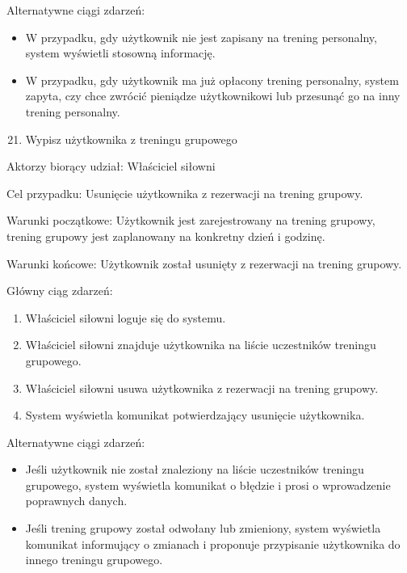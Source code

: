 {Alternatywne ciągi zdarzeń:}

\begin{itemize}
\tightlist
\item
  {W przypadku, gdy użytkownik nie jest zapisany na trening personalny,
  system wyświetli stosowną informację.}
\item
  {W przypadku, gdy użytkownik ma już opłacony trening personalny,
  system zapyta, czy chce zwrócić pieniądze użytkownikowi lub przesunąć
  go na inny trening personalny.}
\end{itemize}

{}

{}

\begin{enumerate}
\setcounter{enumi}{20}
\tightlist
\item
  {Wypisz użytkownika z treningu grupowego}
\end{enumerate}

{Aktorzy biorący udział: Właściciel siłowni}

{Cel przypadku: Usunięcie użytkownika z rezerwacji na trening grupowy.}

{Warunki początkowe: Użytkownik jest zarejestrowany na trening grupowy,
trening grupowy jest zaplanowany na konkretny dzień i godzinę.}

{Warunki końcowe: Użytkownik został usunięty z rezerwacji na trening
grupowy.}

{Główny ciąg zdarzeń:}

\begin{enumerate}
\tightlist
\item
  {Właściciel siłowni loguje się do systemu.}
\item
  {Właściciel siłowni znajduje użytkownika na liście uczestników
  treningu grupowego.}
\item
  {Właściciel siłowni usuwa użytkownika z rezerwacji na trening
  grupowy.}
\item
  {System wyświetla komunikat potwierdzający usunięcie użytkownika.}
\end{enumerate}

{Alternatywne ciągi zdarzeń:}

\begin{itemize}
\tightlist
\item
  {Jeśli użytkownik nie został znaleziony na liście uczestników treningu
  grupowego, system wyświetla komunikat o błędzie i prosi o wprowadzenie
  poprawnych danych.}
\item
  {Jeśli trening grupowy został odwołany lub zmieniony, system wyświetla
  komunikat informujący o zmianach i proponuje przypisanie użytkownika
  do innego treningu grupowego.}
\end{itemize}

